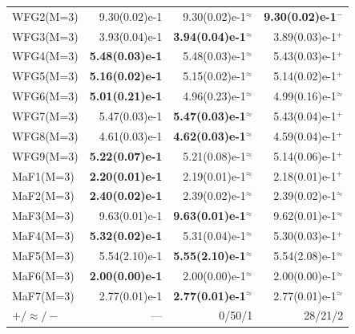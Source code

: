 \begin{table}[t]
\begin{tabular}{lrrr}
WFG2(M=3) & 9.30(0.02)e-1 & 9.30(0.02)e-1$^{\approx}$ & \textbf{9.30(0.02)e-1$^{-}$} \\
WFG3(M=3) & 3.93(0.04)e-1 & \textbf{3.94(0.04)e-1$^{\approx}$} & 3.89(0.03)e-1$^{+}$ \\
WFG4(M=3) & \textbf{5.48(0.03)e-1} & 5.48(0.03)e-1$^{\approx}$ & 5.43(0.03)e-1$^{+}$ \\
WFG5(M=3) & \textbf{5.16(0.02)e-1} & 5.15(0.02)e-1$^{\approx}$ & 5.14(0.02)e-1$^{+}$ \\
WFG6(M=3) & \textbf{5.01(0.21)e-1} & 4.96(0.23)e-1$^{\approx}$ & 4.99(0.16)e-1$^{\approx}$ \\
WFG7(M=3) & 5.47(0.03)e-1 & \textbf{5.47(0.03)e-1$^{\approx}$} & 5.43(0.04)e-1$^{+}$ \\
WFG8(M=3) & 4.61(0.03)e-1 & \textbf{4.62(0.03)e-1$^{\approx}$} & 4.59(0.04)e-1$^{+}$ \\
WFG9(M=3) & \textbf{5.22(0.07)e-1} & 5.21(0.08)e-1$^{\approx}$ & 5.14(0.06)e-1$^{+}$ \\
MaF1(M=3) & \textbf{2.20(0.01)e-1} & 2.19(0.01)e-1$^{\approx}$ & 2.18(0.01)e-1$^{+}$ \\
MaF2(M=3) & \textbf{2.40(0.02)e-1} & 2.39(0.02)e-1$^{\approx}$ & 2.39(0.02)e-1$^{\approx}$ \\
MaF3(M=3) & 9.63(0.01)e-1 & \textbf{9.63(0.01)e-1$^{\approx}$} & 9.62(0.01)e-1$^{\approx}$ \\
MaF4(M=3) & \textbf{5.32(0.02)e-1} & 5.31(0.04)e-1$^{\approx}$ & 5.30(0.03)e-1$^{+}$ \\
MaF5(M=3) & 5.54(2.10)e-1 & \textbf{5.55(2.10)e-1$^{\approx}$} & 5.54(2.08)e-1$^{\approx}$ \\
MaF6(M=3) & \textbf{2.00(0.00)e-1} & 2.00(0.00)e-1$^{\approx}$ & 2.00(0.00)e-1$^{\approx}$ \\
MaF7(M=3) & 2.77(0.01)e-1 & \textbf{2.77(0.01)e-1$^{\approx}$} & 2.77(0.01)e-1$^{\approx}$ \\
\midrule
$+ / \approx / -$ & --- & 0/50/1 & 28/21/2 \\
\bottomrule
\end{tabular}
\end{table}